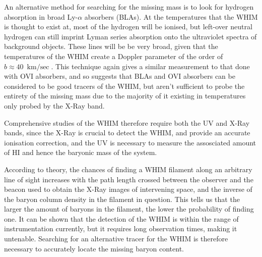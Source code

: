 \par An alternative method for searching for the missing mass is to look for hydrogen absorption in broad Ly-$\alpha$ absorbers (BLAs). At the temperatures that the WHIM is thought to exist at, most of the hydrogen will be ionised, but left-over neutral hydrogen can still imprint Lyman series absorption onto the ultraviolet spectra of background objects. These lines will be be very broad, given that the temperatures of the WHIM create a Doppler parameter of the order of $b\approx \SI{40}{\kilo\meter\per\sec}$. This technique again gives  a similar measurement to that done with OVI absorbers, and so suggests that BLAs and OVI absorbers can be considered to be good tracers of the WHIM, but aren't sufficient to probe the entirety of the missing mass due to the majority of it existing in temperatures only probed by the X-Ray band. 

\par Comprehensive studies of the WHIM therefore require both the UV and X-Ray bands, since the X-Ray is crucial to detect the WHIM, and provide an accurate ionisation correction, and the UV is necessary to measure the assosciated amount of HI and hence the baryonic mass of the system. 

\par According to theory, the chances of finding a WHIM filament along an arbitrary line of sight increases with the path length crossed between the observer and the beacon used to obtain the X-Ray images of intervening space, and the inverse of the baryon column density in the filament in question. This tells us that the larger the amount of baryons in the filament, the lower the probability of finding one. It can be shown that the detection of the WHIM is within the range of instrumentation currently, but it requires long observation times, making it untenable. Searching for an alternative tracer for the WHIM is therefore necessary to accurately locate the missing baryon content.


